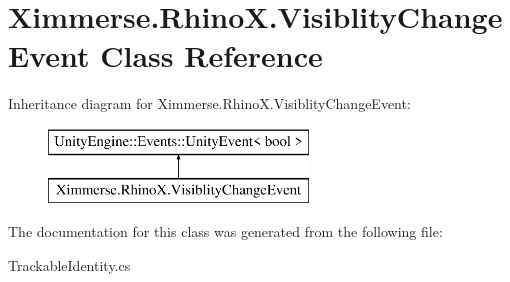 \hypertarget{class_ximmerse_1_1_rhino_x_1_1_visiblity_change_event}{}\section{Ximmerse.\+Rhino\+X.\+Visiblity\+Change\+Event Class Reference}
\label{class_ximmerse_1_1_rhino_x_1_1_visiblity_change_event}
Inheritance diagram for Ximmerse.\+Rhino\+X.\+Visiblity\+Change\+Event\+:\begin{figure}[H]
\begin{center}
\leavevmode
\includegraphics[height=2.000000cm]{class_ximmerse_1_1_rhino_x_1_1_visiblity_change_event}
\end{center}
\end{figure}


The documentation for this class was generated from the following file\+:\begin{DoxyCompactItemize}
\item 
Trackable\+Identity.\+cs\end{DoxyCompactItemize}
